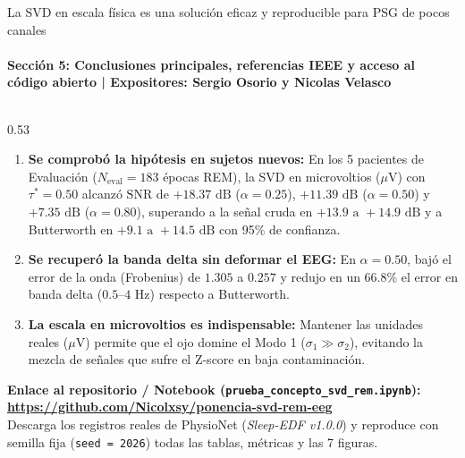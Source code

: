 \documentclass[aspectratio=169,9pt]{beamer}
\newcommand{\RepoURL}{https://github.com/Nicolxsy/ponencia-svd-rem-eeg}
\begin{document}
\begin{frame}{La SVD en escala f\'isica es una soluci\'on eficaz y reproducible para PSG de pocos canales}
  \framesubtitle{Secci\'on 5: Conclusiones principales, referencias IEEE y acceso al c\'odigo abierto | Expositores: Sergio Osorio y Nicolas Velasco}

  \begin{columns}[T,onlytextwidth]
    \begin{column}{0.53\textwidth}
      \begin{tcolorbox}[tealcard, title={\scriptsize\bfseries Conclusiones Verificadas de la Prueba de Concepto}, colbacktitle=UDTeal!85!black, coltitle=white]
        \scriptsize
        \begin{enumerate}\setlength{\itemsep}{2pt}
          \item \textbf{Se comprob\'o la hip\'otesis en sujetos nuevos:} En los 5 pacientes de Evaluaci\'on ($N_{\text{eval}}=183$ \'epocas REM), la SVD en microvoltios ($\mu\text{V}$) con $\tau^*=0.50$ alcanz\'o $\text{SNR}$ de $+18.37\text{ dB}$ ($\alpha=0.25$), $+11.39\text{ dB}$ ($\alpha=0.50$) y $+7.35\text{ dB}$ ($\alpha=0.80$), superando a la se\~nal cruda en $+13.9\text{ a }+14.9\text{ dB}$ y a Butterworth en $+9.1\text{ a }+14.5\text{ dB}$ con 95\% de confianza.
          \item \textbf{Se recuper\'o la banda delta sin deformar el EEG:} En $\alpha=0.50$, baj\'o el error de la onda (Frobenius) de $1.305$ a $0.257$ y redujo en un $66.8\%$ el error en banda delta ($0.5\text{--}4\text{ Hz}$) respecto a Butterworth.
          \item \textbf{La escala en microvoltios es indispensable:} Mantener las unidades reales ($\mu\text{V}$) permite que el ojo domine el Modo 1 ($\sigma_1 \gg \sigma_2$), evitando la mezcla de se\~nales que sufre el Z-score en baja contaminaci\'on.
        \end{enumerate}
      \end{tcolorbox}

      \vspace{0.05cm}

      \begin{tcolorbox}[navycard, title={\scriptsize\bfseries Reproducibilidad: Repositorio y Cuaderno Ejecutable}, colbacktitle=UDNavy, coltitle=white]
        \scriptsize
        \textbf{Enlace al repositorio / Notebook (\texttt{prueba\_concepto\_svd\_rem.ipynb}):}\\
        {\scriptsize\bfseries\color{UDNavy}\url{\RepoURL}}\\[0.03cm]
        {\tiny Descarga los registros reales de PhysioNet (\textit{Sleep-EDF v1.0.0}) y reproduce con semilla fija (\texttt{seed = 2026}) todas las tablas, m\'etricas y las 7 figuras.}
      \end{tcolorbox}
    \end{column}


\end{columns}
\end{frame}
\end{document}
